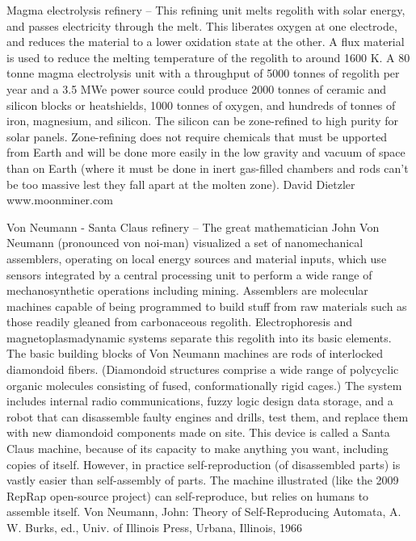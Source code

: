\documentclass[a4paper]{book}
\begin{document}
Magma electrolysis refinery – This refining unit melts regolith with solar energy, and passes electricity through the melt.  This liberates oxygen at one electrode, and reduces the material to a lower oxidation state at the other. A flux material is used to reduce the melting temperature of the regolith to around 1600 K. A 80 tonne magma electrolysis unit with a throughput of 5000 tonnes of regolith per year and a 3.5 MWe power source could produce 2000 tonnes of ceramic and silicon blocks or heatshields, 1000 tonnes of oxygen, and hundreds of tonnes of iron, magnesium, and silicon.  The silicon can be zone-refined to high purity for solar panels.  Zone-refining does not require chemicals that must be upported from Earth and will be done more easily in the low gravity and vacuum of space than on Earth (where it must be done in inert gas-filled chambers and rods can't be too massive lest they fall apart at the molten zone). David Dietzler www.moonminer.com
 
Von Neumann - Santa Claus refinery – The great mathematician John Von Neumann (pronounced von noi-man) visualized a set of nanomechanical assemblers, operating on local energy sources and material inputs, which use sensors integrated by a central processing unit to perform a wide range of mechanosynthetic operations including mining.  Assemblers are molecular machines capable of being programmed to build stuff from raw materials such as those readily gleaned from carbonaceous regolith. Electrophoresis and magnetoplasmadynamic systems separate this regolith into its basic elements. The basic building blocks of Von Neumann machines are rods of interlocked diamondoid fibers. (Diamondoid structures comprise a wide range of polycyclic organic molecules consisting of fused, conformationally rigid cages.) The system includes internal radio communications, fuzzy logic design data storage, and a robot that can disassemble faulty engines and drills, test them, and replace them with new diamondoid components made on site. This device is called a Santa Claus machine, because of its capacity to make anything you want, including copies of itself. However, in practice self-reproduction (of disassembled parts) is vastly easier than self-assembly of parts.  The machine illustrated (like the 2009 RepRap open-source project) can self-reproduce, but relies on humans to assemble itself. Von Neumann, John: Theory of Self-Reproducing Automata, A. W. Burks, ed., Univ. of Illinois Press, Urbana, Illinois, 1966
 
\end{document}
